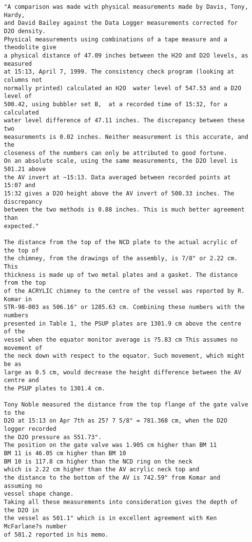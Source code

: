 \begin{verbatim}
"A comparison was made with physical measurements made by Davis, Tony, Hardy,
and David Bailey against the Data Logger measurements corrected for D2O density.
Physical measurements using combinations of a tape measure and a theodolite give
a physical distance of 47.09 inches between the H2O and D2O levels, as measured
at 15:13, April 7, 1999. The consistency check program (looking at columns not
normally printed) calculated an H2O  water level of 547.53 and a D2O level of
500.42, using bubbler set B,  at a recorded time of 15:32, for a calculated
water level difference of 47.11 inches. The discrepancy between these two
measurements is 0.02 inches. Neither measurement is this accurate, and the
closeness of the numbers can only be attributed to good fortune.
On an absolute scale, using the same measurements, the D2O level is 501.21 above
the AV invert at ~15:13. Data averaged between recorded points at 15:07 and
15:32 gives a D2O height above the AV invert of 500.33 inches. The discrepancy
between the two methods is 0.88 inches. This is much better agreement than
expected."

The distance from the top of the NCD plate to the actual acrylic of the top of
the chimney, from the drawings of the assembly, is 7/8" or 2.22 cm. This
thickness is made up of two metal plates and a gasket. The distance from the top
of the ACRYLIC chimney to the centre of the vessel was reported by R. Komar in
STR-98-003 as 506.16" or 1285.63 cm. Combining these numbers with the numbers
presented in Table 1, the PSUP plates are 1301.9 cm above the centre of the
vessel when the equator monitor average is ?5.83 cm This assumes no movement of
the neck down with respect to the equator. Such movement, which might be as
large as 0.5 cm, would decrease the height difference between the AV centre and
the PSUP plates to 1301.4 cm.

Tony Noble measured the distance from the top flange of the gate valve to the
D2O at 15:13 on Apr 7th as 25? 7 5/8" = 781.368 cm, when the D2O logger recorded
the D2O pressure as 551.73".
The position on the gate valve was 1.905 cm higher than BM 11
BM 11 is 46.05 cm higher than BM 10
BM 10 is 117.8 cm higher than the NCD ring on the neck
which is 2.22 cm higher than the AV acrylic neck top and
the distance to the bottom of the AV is 742.59" from Komar and assuming no
vessel shape change.
Taking all these measurements into consideration gives the depth of the D2O in
the vessel as 501.1" which is in excellent agreement with Ken McFarlane?s number
of 501.2 reported in his memo.
\end{verbatim}


